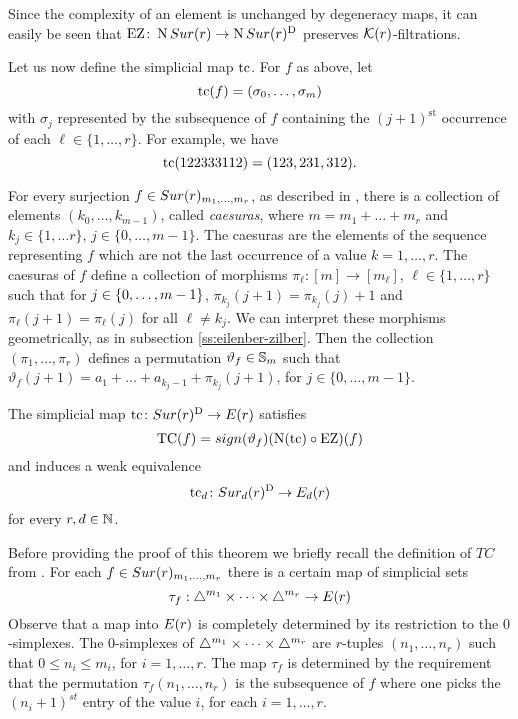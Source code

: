 Since the complexity of an element is unchanged by degeneracy maps, it can easily be seen that $\operatorname{EZ} \colon \operatorname{N}Sur(r) \to \operatorname{N}Sur(r)^{\mathrm{D}}$ preserves $\mathcal{K}(r)$-filtrations.

Let us now define the simplicial map $\operatorname{tc}$.
For $f$ as above, let
\[
\operatorname{tc}(f) = (\sigma_0,\dots,\sigma_m)
\]
with $\sigma_j$ represented by the subsequence of $f$ containing the $(j+1)^{\mathrm{st}}$ occurrence of each $\ell \in \{1,\dots,r\}$.
For example, we have
\[
\operatorname{tc}(122333112) = (123,231,312).
\]

For every surjection $f\in Sur(r)_{m_1,\dots,m_r}$, as described in \cite[\S1.2.2]{berger1997confspacemodel}, there is a collection of elements $(k_0 ,\dots , k_{m-1})$, called \textit{caesuras}, where $m=m_1+\dots + m_r$ and $k_j \in \{1,\dots r\}$, $j\in\{0,\dots, m-1\}$. The caesuras are the elements of the sequence representing $f$ which are not the last occurrence of a value $k= 1,\dots, r$. The caesuras of
$f$ define a collection of morphisms $\pi_\ell \colon [m] \to [m_\ell]$, $\ell\in\{1,\dots,r\}$ such that for $j \in \{0,\dots,m-1\}$,  $\pi_{k_j}(j+1) = \pi_{k_j}(j)+1$ and $\pi_\ell(j+1) = \pi_\ell(j)$ for all $\ell \neq k_j$. We can interpret these morphisms geometrically, as in subsection \ref{ss:eilenber-zilber}. Then the collection $(\pi_1, \dots, \pi_r)$ defines a permutation $\vartheta_f\in \mathbb{S}_m$ such that $\vartheta_f(j+1)=a_1 +\dots+ a_{k_j -1} + \pi_{k_j}(j+1)$, for $ j\in\{0,\dots, m-1\}$.

\begin{theorem}\label{thm:tc-decomposition}
	The simplicial map $\operatorname{tc} \colon Sur(r)^{\mathrm{D}} \to E(r)$ satisfies
	\[
	\operatorname{TC}(f) = sign(\vartheta_f)(\operatorname{N}(\operatorname{tc}) \circ \operatorname{EZ} )(f)
	\]
	and induces a weak equivalence
	\[
	\operatorname{tc}_d \colon Sur_d(r)^{\mathrm{D}} \to E_d(r)
	\]
	for every $r,d \in \mathbb{N}$.
\end{theorem}

Before providing the proof of this theorem we briefly recall the definition of $TC$ from \cite[]{berger2002prismatic}. For each $f\in Sur(r)_{m_1,\dots,m_r}$ there is a certain map of simplicial sets $$\tau_f:\triangle^{m_1}\times\dots\times\triangle^{m_r}\to E(r)$$ Observe that a map into $E(r)$ is completely determined by its restriction to the $0$-simplexes. The $0$-simplexes of $\triangle^{m_1}\times\dots\times\triangle^{m_r}$ are $r$-tuples
$(n_1,\dots,n_r)$ such that $0 \leq n_i \leq m_i$,
for $i=1,\dots,r$. The map $\tau_f$ is determined by
the requirement that the permutation $\tau_f(n_1,\dots,n_r)$ is the subsequence of $f$ where one picks the $(n_i+1)^{st}$ entry of the value $i$, for each $i=1,\dots,r$.

